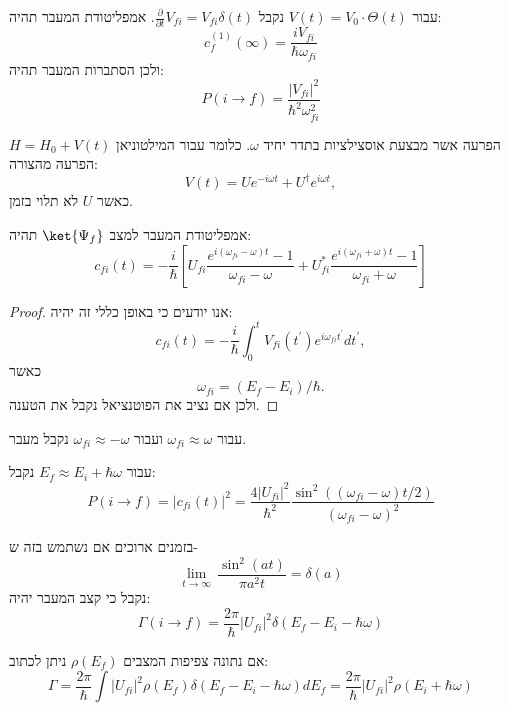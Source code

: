 \documentclass{tstextbook}
\begin{document}
\begin{example}
עבור \(V(t)=V_{0}\cdot \Theta(t)\) נקבל \(\frac{\partial }{\partial t}V_{fi}=V_{fi}\delta(t)\). אמפליטודת המעבר תהיה:
$$c_{f}^{(1)}(\infty)=\frac{i V_{f i}}{\hbar\omega_{f i}}$$
ולכן הסתברות המעבר תהיה:
$$P(i\to f)=\frac{|V_{f i}|^{2}}{\hbar^{2}\omega_{f i}^{2}}$$

\end{example}
\begin{definition}
הפרעה אשר מבצעת אוסצילציות בתדר יחיד \(\omega\). כלומר עבור המילטוניאן \(H=H_{0}+V(t)\) הפרעה מהצורה:
$$V(t)=U e^{-i\omega t}+U^{\dagger}e^{i\omega t},$$
כאשר \(U\) לא תלוי בזמן.

\end{definition}
\begin{proposition}
אמפליטודת המעבר למצב \(\ket{\Psi_{f}}\) תהיה:
$$c_{f i}(t)=-\frac{i}{\hbar}\left[U_{f i}\frac{e^{i(\omega_{f i}-\omega)t}-1}{\omega_{f i}-\omega}+U_{f i}^{*}\frac{e^{i(\omega_{f i}+\omega)t}-1}{\omega_{f i}+\omega}\right]$$

\end{proposition}
\begin{proof}
אנו יודעים כי באופן כללי זה יהיה:
$$c_{f i}(t)=-\frac{i}{\hbar}\int_{0}^{t}V_{f i}(t^{\prime})e^{i\omega_{f i}t^{\prime}}d t^{\prime},$$
כאשר $$\omega_{f i}=(E_{f}-E_{i})/\hbar.$$ולכן אם נציב את הפוטנציאל נקבל את הטענה.

\end{proof}
\begin{proposition}
עבור \(\omega_{fi}\approx \omega\) ועבור \(\omega_{fi}\approx-\omega\) נקבל מעבר.

\end{proposition}
\begin{proposition}
עבור \(E_{f}\approx E_{i}+\hbar \omega\) נקבל:
$$P(i\to f)=|c_{f i}(t)|^{2}=\frac{4|U_{f i}|^{2}}{\hbar^{2}}\frac{\sin^{2}\left((\omega_{f i}-\omega)t/2\right)}{(\omega_{f i}-\omega)^{2}}$$

\end{proposition}
\begin{proposition}
בזמנים ארוכים אם נשתמש בזה ש-
$$\operatorname*{lim}_{t\rightarrow\infty}\,\frac{\sin^{2}(a t)}{\pi a^{2}t}=\delta(a)$$
נקבל כי קצב המעבר יהיה:
$$\Gamma(i\to f)=\frac{2\pi}{\hbar}|U_{f i}|^{2}\delta(E_{f}-E_{i}-\hbar\omega)$$

\end{proposition}
\begin{corollary}
אם נתונה צפיפות המצבים \(\rho(E_{f})\) ניתן לכתוב:
$$\Gamma=\frac{2\pi}{\hbar}\int|U_{f i}|^{2}\rho(E_{f})\delta(E_{f}-E_{i}-\hbar\omega)d E_{f}=\frac{2\pi}{\hbar}|U_{f i}|^{2}\rho(E_{i}+\hbar\omega)$$

\end{corollary}
\end{document}
